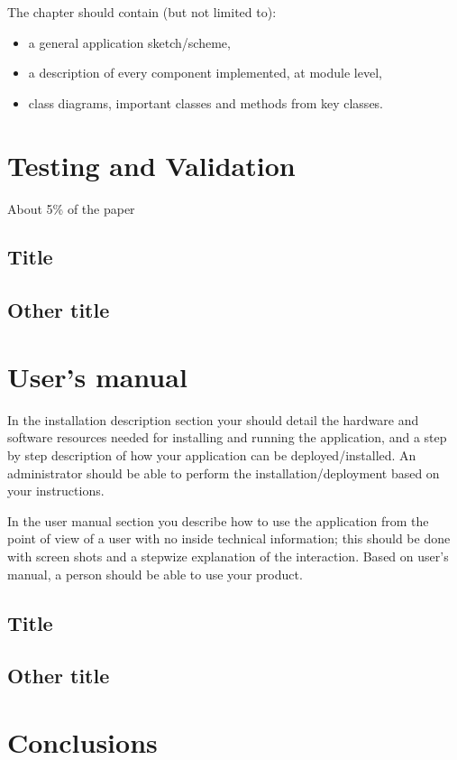\documentclass[12pt,a4paper,twoside]{report}
\begin{document}
The chapter should contain (but not limited to):
\begin{itemize}
 \item a general application sketch/scheme,
\item a description of every component implemented, at module level,
\item class diagrams, important classes and methods from key classes.
\end{itemize}

\chapter{Testing and Validation}

About 5\% of the paper
\section{Title}
\section{Other title}

\chapter{User's manual}

In the installation description section your should detail the hardware and software resources needed for installing and running the application, and a step by step description of how your application can be deployed/installed. An administrator should be able to perform the installation/deployment based on your instructions.

In the user manual section you describe how to use the application from the point of view of a user with no inside technical information; this should be done with screen shots and a stepwize explanation of the interaction. Based on user's manual, a person should be able to use your product.

\section{Title}
\section{Other title}

\chapter{Conclusions}
\end{document}
